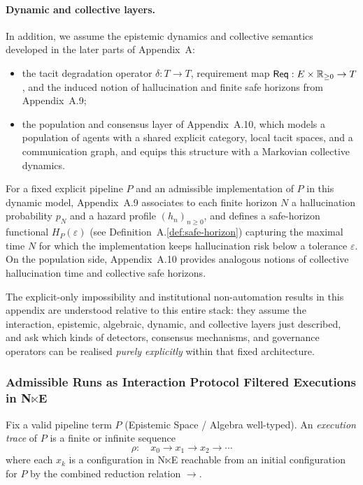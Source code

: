 \paragraph{Dynamic and collective layers.}
In addition, we assume the epistemic dynamics and collective semantics developed in the later parts of
Appendix~A:
\begin{itemize}
  \item the tacit degradation operator $\delta : T \to T$, requirement map
        $\mathsf{Req} : E \times \mathbb{R}_{\ge 0} \to T$, and the induced notion of hallucination and
        finite safe horizons from Appendix~A.9;
  \item the population and consensus layer of Appendix~A.10, which models a population of agents
        with a shared explicit category, local tacit spaces, and a communication graph, and equips
        this structure with a Markovian collective dynamics.
\end{itemize}
For a fixed explicit pipeline $P$ and an admissible implementation of $P$ in this dynamic model,
Appendix~A.9 associates to each finite horizon $N$ a hallucination probability $p_N$ and a
hazard profile $(h_n)_{n \geq 0}$, and defines a safe-horizon functional
$H_P(\varepsilon)$ (see Definition~A.\ref{def:safe-horizon}) capturing the maximal time $N$ for which
the implementation keeps hallucination risk below a tolerance $\varepsilon$. On the population side,
Appendix~A.10 provides analogous notions of collective hallucination time and collective
safe horizons.

The explicit-only impossibility and institutional non-automation results in this appendix are
understood relative to this entire stack: they assume the interaction, epistemic, algebraic,
dynamic, and collective layers just described, and ask which kinds of detectors, consensus
mechanisms, and governance operators can be realised \emph{purely explicitly} within that fixed
architecture.


\subsubsection{Admissible Runs as Interaction Protocol Filtered Executions in \texorpdfstring{N$\ltimes$E}{N ltimes E}}
\begin{definition}
Fix a valid pipeline term $P$ (Epistemic Space / Algebra well-typed). An \emph{execution trace} of $P$ is a finite or infinite sequence
\[
\rho:\quad x_0 \to x_1 \to x_2 \to \cdots
\]
where each $x_k$ is a configuration in N$\ltimes$E reachable from an initial configuration for $P$ by the combined reduction relation $\to$.
\end{definition}

